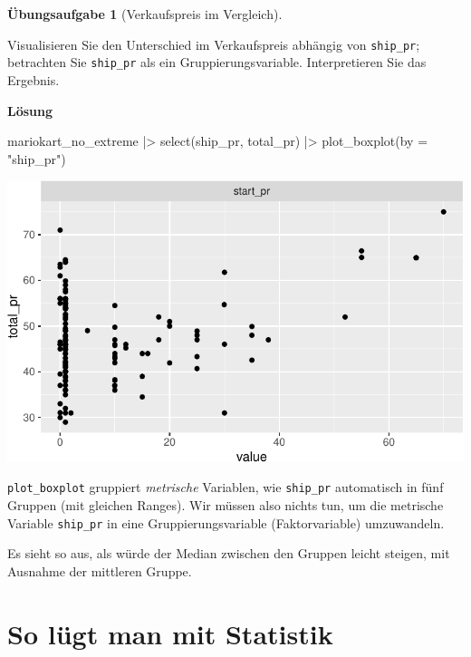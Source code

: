 \documentclass[
  letterpaper,
]{scrbook}
\newenvironment{Shaded}{\begin{snugshade}}{\end{snugshade}}
\newcommand{\AttributeTok}[1]{\textcolor[rgb]{0.40,0.45,0.13}{#1}}
\newcommand{\FunctionTok}[1]{\textcolor[rgb]{0.28,0.35,0.67}{#1}}
\newcommand{\NormalTok}[1]{\textcolor[rgb]{0.00,0.23,0.31}{#1}}
\newcommand{\SpecialCharTok}[1]{\textcolor[rgb]{0.37,0.37,0.37}{#1}}
\newcommand{\StringTok}[1]{\textcolor[rgb]{0.13,0.47,0.30}{#1}}
\theoremstyle{definition}
\theoremstyle{definition}
\theoremstyle{definition}
\newtheorem{exercise}{Übungsaufgabe}[chapter]
\theoremstyle{remark}
\begin{document}
\begin{exercise}[Verkaufspreis im
Vergleich]\protect\hypertarget{exr-diff-plot}{}\label{exr-diff-plot}

Visualisieren Sie den Unterschied im Verkaufspreis abhängig von
\texttt{ship\_pr}; betrachten Sie \texttt{ship\_pr} als ein
Gruppierungsvariable. Interpretieren Sie das Ergebnis.

\textbf{Lösung}

\begin{Shaded}
\begin{Highlighting}[]
\NormalTok{mariokart\_no\_extreme }\SpecialCharTok{|\textgreater{}} 
  \FunctionTok{select}\NormalTok{(ship\_pr, total\_pr) }\SpecialCharTok{|\textgreater{}} 
  \FunctionTok{plot\_boxplot}\NormalTok{(}\AttributeTok{by =} \StringTok{"ship\_pr"}\NormalTok{)}
\end{Highlighting}
\end{Shaded}

\begin{center}
\includegraphics[width=0.7\linewidth,height=\textheight,keepaspectratio]{040-verbildlichen_files/figure-pdf/unnamed-chunk-35-1.pdf}
\end{center}

\texttt{plot\_boxplot} gruppiert \emph{metrische} Variablen, wie
\texttt{ship\_pr} automatisch in fünf Gruppen (mit gleichen Ranges). Wir
müssen also nichts tun, um die metrische Variable \texttt{ship\_pr} in
eine Gruppierungsvariable (Faktorvariable) umzuwandeln.

Es sieht so aus, als würde der Median zwischen den Gruppen leicht
steigen, mit Ausnahme der mittleren Gruppe.

\end{exercise}

\section{So lügt man mit Statistik}\label{so-luxfcgt-man-mit-statistik}
\end{document}
